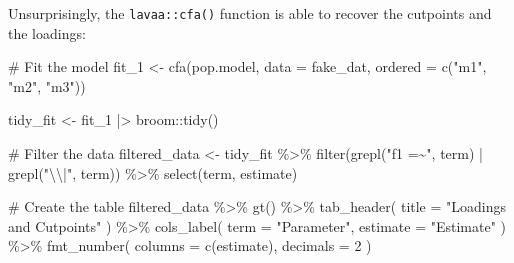 \documentclass[
  letterpaper,
  DIV=11,
  numbers=noendperiod]{scrreprt}
\newenvironment{Shaded}{\begin{snugshade}}{\end{snugshade}}
\newcommand{\AttributeTok}[1]{\textcolor[rgb]{0.40,0.45,0.13}{#1}}
\newcommand{\CommentTok}[1]{\textcolor[rgb]{0.37,0.37,0.37}{#1}}
\newcommand{\DecValTok}[1]{\textcolor[rgb]{0.68,0.00,0.00}{#1}}
\newcommand{\FunctionTok}[1]{\textcolor[rgb]{0.28,0.35,0.67}{#1}}
\newcommand{\NormalTok}[1]{\textcolor[rgb]{0.00,0.23,0.31}{#1}}
\newcommand{\OtherTok}[1]{\textcolor[rgb]{0.00,0.23,0.31}{#1}}
\newcommand{\SpecialCharTok}[1]{\textcolor[rgb]{0.37,0.37,0.37}{#1}}
\newcommand{\StringTok}[1]{\textcolor[rgb]{0.13,0.47,0.30}{#1}}
\begin{document}
Unsurprisingly, the \texttt{lavaa::cfa()} function is able to recover
the cutpoints and the loadings:

\begin{Shaded}
\begin{Highlighting}[]
\CommentTok{\# Fit the model}
\NormalTok{fit\_1 }\OtherTok{\textless{}{-}} \FunctionTok{cfa}\NormalTok{(pop.model, }\AttributeTok{data =}\NormalTok{ fake\_dat, }\AttributeTok{ordered =} \FunctionTok{c}\NormalTok{(}\StringTok{"m1"}\NormalTok{, }\StringTok{"m2"}\NormalTok{, }\StringTok{"m3"}\NormalTok{))}

\NormalTok{tidy\_fit }\OtherTok{\textless{}{-}}\NormalTok{ fit\_1 }\SpecialCharTok{|\textgreater{}}\NormalTok{ broom}\SpecialCharTok{::}\FunctionTok{tidy}\NormalTok{()}

\CommentTok{\# Filter the data}
\NormalTok{filtered\_data }\OtherTok{\textless{}{-}}\NormalTok{ tidy\_fit }\SpecialCharTok{\%\textgreater{}\%} 
  \FunctionTok{filter}\NormalTok{(}\FunctionTok{grepl}\NormalTok{(}\StringTok{"f1 =\textasciitilde{}"}\NormalTok{, term) }\SpecialCharTok{|} \FunctionTok{grepl}\NormalTok{(}\StringTok{"}\SpecialCharTok{\textbackslash{}\textbackslash{}}\StringTok{|"}\NormalTok{, term)) }\SpecialCharTok{\%\textgreater{}\%} 
  \FunctionTok{select}\NormalTok{(term, estimate)}

\CommentTok{\# Create the table}
\NormalTok{filtered\_data }\SpecialCharTok{\%\textgreater{}\%}
  \FunctionTok{gt}\NormalTok{() }\SpecialCharTok{\%\textgreater{}\%}
  \FunctionTok{tab\_header}\NormalTok{(}
    \AttributeTok{title =} \StringTok{"Loadings and Cutpoints"}
\NormalTok{  ) }\SpecialCharTok{\%\textgreater{}\%}
  \FunctionTok{cols\_label}\NormalTok{(}
    \AttributeTok{term =} \StringTok{"Parameter"}\NormalTok{,}
    \AttributeTok{estimate =} \StringTok{"Estimate"}
\NormalTok{  ) }\SpecialCharTok{\%\textgreater{}\%}
  \FunctionTok{fmt\_number}\NormalTok{(}
    \AttributeTok{columns =} \FunctionTok{c}\NormalTok{(estimate),}
    \AttributeTok{decimals =} \DecValTok{2}
\NormalTok{  )}
\end{Highlighting}
\end{Shaded}
\end{document}
